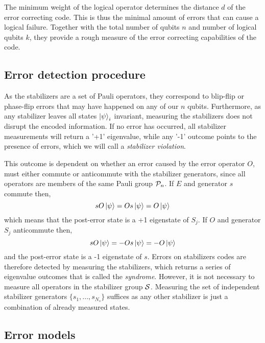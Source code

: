 The minimum weight of the logical operator determines the distance $d$ of the error correcting code. This is thus the minimal amount of errors that can cause a logical failure. Together with the total number of qubits $n$ and number of logical qubits $k$, they provide a rough measure of the error correcting capabilities of the code.

\subsection{Error detection procedure}

As the stabilizers are a set of Pauli operators, they correspond to blip-flip or phase-flip errors that may have happened on any of our $n$ qubits. Furthermore, as any stabilizer leaves all states  $\ket{\psi}_i$ invariant, measuring the stabilizers does not disrupt the encoded information. If no error has occurred, all stabilizer measurements will return a '+1' eigenvalue, while any '-1' outcome points to the presence of errors, which we will call a \emph{stabilizer violation}.

This outcome is dependent on whether an error caused by the error operator $O$, must either commute or anticommute with the stabilizer generators, since all operators are members of the same Pauli group $\mathcal{P}_n$. If $E$ and generator $s$ commute then,
\begin{equation}
  sO\ket{\psi} = Os\ket{\psi} = O\ket{\psi}
\end{equation}
which means that the post-error state is a +1 eigenstate of $S_j$. If $O$ and generator $S_j$ anticommute then,
\begin{equation}\label{qec:eq:stabmeas}
  sO\ket{\psi} = -Os\ket{\psi} = -O\ket{\psi}
\end{equation}
and the post-error state is a -1 eigenstate of $s$. Errors on stabilizers codes are therefore detected by measuring the stabilizers, which returns a series of eigenvalue outcomes that is called the \emph{syndrome}. However, it is not necessary to measure all operators in the stabilizer group $\mathcal{S}$. Measuring the set of independent stabilizer generators $\{s_1,...,s_{N_s}\}$ suffices as any other stabilizer is just a combination of already measured states.

\subsection{Error models}\label{qec:sec_errormodels}

